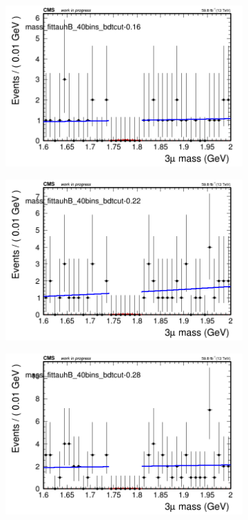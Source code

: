 \begin{figure}[H]
\begin{subfigure}{0.2\textwidth}
        \includegraphics[width=\textwidth]{unfixed_exp/plots/tauhB/massfit_tauhB_40bins_bdtcut-0.16.png}
        \caption{}
    \end{subfigure}
    \begin{subfigure}{0.2\textwidth}
        \includegraphics[width=\textwidth]{unfixed_exp/plots/tauhB/massfit_tauhB_40bins_bdtcut-0.22.png}
        \caption{}
    \end{subfigure}
    \begin{subfigure}{0.2\textwidth}
        \includegraphics[width=\textwidth]{unfixed_exp/plots/tauhB/massfit_tauhB_40bins_bdtcut-0.28.png}

\end{subfigure}
\end{figure}
